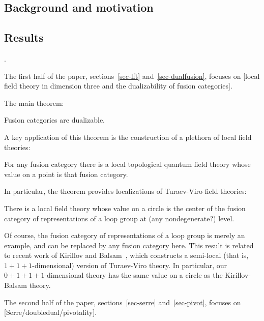 \documentclass{amsart}
\begin{document}
\subsection{Background and motivation}

\subsection{Results}.


The first half of the paper, sections~\ref{sec-lft} and~\ref{sec-dualfusion}, focuses on [local field theory in dimension three and the dualizability of fusion categories].

The main theorem:
\begin{theorem}
Fusion categories are dualizable.
\end{theorem}

A key application of this theorem is the construction of a plethora of local field theories:
\begin{corollary}
For any fusion category there is a local topological quantum field theory whose value on a point is that fusion category.
\end{corollary}

In particular, the theorem provides localizations of Turaev-Viro field theories:
\begin{corollary}
There is a local field theory whose value on a circle is the center of the fusion category of representations of a loop group at (any nondegenerate?) level.
\end{corollary}
Of course, the fusion category of representations of a loop group is merely an example, and can be replaced by any fusion category here.  This result is related to recent work of Kirillov and Balsam~\cite{kirillovbalsam}, which constructs a semi-local (that is, $1+1+1$-dimensional) version of Turaev-Viro theory.  In particular, our $0+1+1+1$-dimensional theory has the same value on a circle as the Kirillov-Balsam theory.  


The second half of the paper, sections~\ref{sec-serre} and~\ref{sec-pivot}, focuses on [Serre/doubledual/pivotality].
\end{document}
